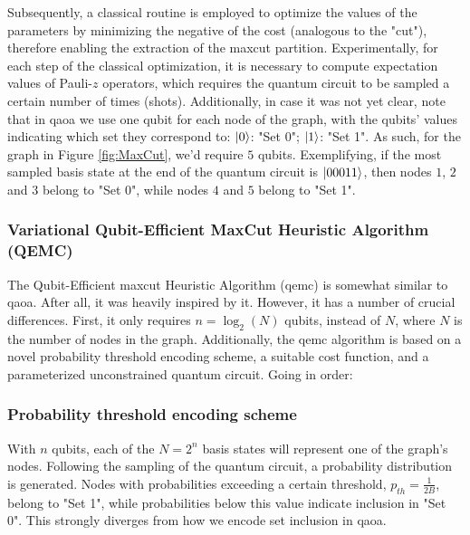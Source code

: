 Subsequently, a classical routine is employed to optimize the values of the parameters by minimizing the negative of the cost (analogous to the "cut"), therefore enabling the extraction of the \acrshort{maxcut} partition. Experimentally, for each step of the classical optimization, it is necessary to compute expectation values of Pauli-$z$ operators, which requires the quantum circuit to be sampled a certain number of times (shots). Additionally, in case it was not yet clear, note that in \acrshort{qaoa} we use one qubit for each node of the graph, with the qubits' values indicating which set they correspond to: $\ket{0}$: "Set 0"; $\ket{1}$: "Set 1". As such, for the graph in Figure \ref{fig:MaxCut}, we'd require $5$ qubits. Exemplifying, if the most sampled basis state at the end of the quantum circuit is $\ket{00011}$, then nodes $1$, $2$ and $3$ belong to "Set 0", while nodes $4$ and $5$ belong to "Set 1".


\subsubsection{Variational Qubit-Efficient MaxCut Heuristic Algorithm (QEMC)}
\label{subsubsection:QEMC}


The Qubit-Efficient \acrshort{maxcut} Heuristic Algorithm (\acrshort{qemc}) \cite{tenecohen2023variational} is somewhat similar to \acrshort{qaoa}. After all, it was heavily inspired by it. However, it has a number of crucial differences. First, it only requires $n = \log_2(N)$ qubits, instead of $N$, where $N$ is the number of nodes in the graph. Additionally, the \acrshort{qemc} algorithm is based on a novel probability threshold encoding scheme, a suitable cost function, and a parameterized unconstrained quantum circuit. Going in order:

\subsubsection*{\small Probability threshold encoding scheme}
With $n$ qubits, each of the $N = 2^{n}$ basis states will represent one of the graph's nodes. Following the sampling of the quantum circuit, a probability distribution is generated. Nodes with probabilities exceeding a certain threshold, $p_{th} = \frac{1}{2B}$, belong to "Set 1", while probabilities below this value indicate inclusion in "Set 0". This strongly diverges from how we encode set inclusion in \acrshort{qaoa}.

